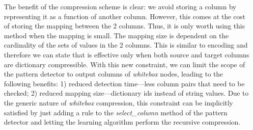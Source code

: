The benefit of the  compression scheme is clear: we avoid storing a column by representing it as a function of another column. However, this comes at the cost of storing the mapping between the 2 columns. Thus, it is only worth using this method when the mapping is small. The mapping size is dependent on the cardinality of the sets of values in the 2 columns. This is similar to  encoding and therefore we can state that  is effective only when both source and target columns are dictionary compressible.  With this new constraint, we can limit the scope of the  pattern detector to output columns of \textit{whitebox}  nodes, leading to the following benefits: 1) reduced detection time---less column pairs that need to be checked; 2) reduced mapping size---dictionary ids instead of string values. Due to the generic nature of \textit{whitebox} compression, this constraint can be implicitly satisfied by just adding a rule to the \textit{select\_column} method of the  pattern detector and letting the learning algorithm perform the recursive compression.

